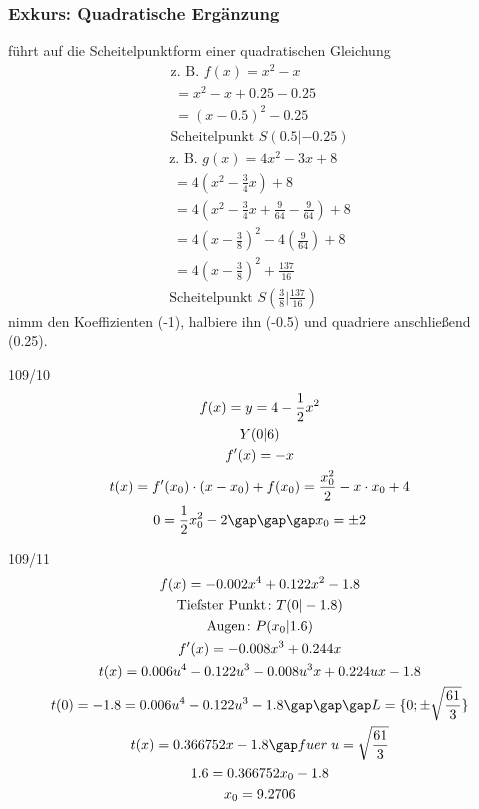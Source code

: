 \subsubsection{Exkurs: Quadratische Ergänzung}
führt auf die Scheitelpunktform einer quadratischen Gleichung
\begin{gather*}
  \text{z. B. } f(x) = x^2 - x \\
  \; = x^2 - x + 0.25 - 0.25 \\
  \; = (x - 0.5)^2 - 0.25 \\
  \text{Scheitelpunkt } S(0.5|-0.25)
\end{gather*}
\begin{gather*}
  \text{z. B. } g(x) = 4x^2 - 3x + 8 \\
  \; = 4(x^2 - \frac{3}{4}x) + 8 \\
  \; = 4(x^2 - \frac{3}{4}x + \frac{9}{64} - \frac{9}{64}) + 8 \\
  \; = 4(x - \frac{3}{8})^2 - 4(\frac{9}{64}) + 8 \\
  \; = 4(x - \frac{3}{8})^2 + \frac{137}{16} \\
  \text{Scheitelpunkt } S(\frac{3}{8}|\frac{137}{16})
\end{gather*}
nimm den Koeffizienten (-1), halbiere ihn (-0.5) und quadriere anschließend (0.25).
\begin{exercise}{109/10}
  \begin{gather*}
    f(x) = y = 4 - \frac{1}{2}x^2 \\
    Y(0|6) \\
    f'(x) = -x \\
    t(x) = f'(x_0) \cdot (x - x_0) + f(x_0) = \frac{x_0^2}{2} - x \cdot x_0 + 4 \\
    0 = \frac{1}{2}x_0^2 - 2 \gap\gap\gap x_0 = \pm 2
  \end{gather*}
\end{exercise}
\begin{exercise}{109/11}
  \begin{gather*}
    f(x) = -0.002x^4 + 0.122x^2 - 1.8 \\
    \text{Tiefster Punkt} \colon T(0|-1.8) \\
    \text{Augen} \colon P(x_0|1.6) \\
    f'(x) = -0.008x^3 + 0.244x \\
    t(x) = 0.006u^4 - 0.122u^3 - 0.008u^3x + 0.224ux - 1.8 \\
    t(0) = -1.8 = 0.006u^4 - 0.122u^3 - 1.8 \gap\gap\gap L = \{0; \pm\sqrt{\frac{61}{3}}\} \\
    t(x) = 0.366752x - 1.8 \gap fuer \; u = \sqrt{\frac{61}{3}} \\
    1.6 = 0.366752x_0 - 1.8 \\
    x_0 = 9.2706
  \end{gather*}
\end{exercise}
